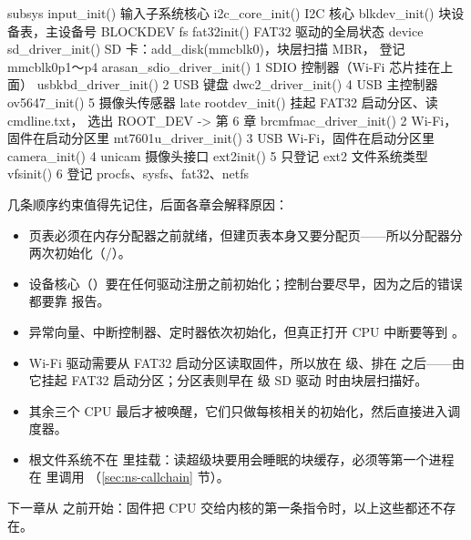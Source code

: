 \begin{txtcode}
subsys   input_init()                 输入子系统核心
         i2c_core_init()              I2C 核心
         blkdev_init()                块设备表，主设备号 BLOCKDEV
fs       fat32init()                  FAT32 驱动的全局状态
device   sd_driver_init()             SD 卡：add_disk(mmcblk0)，块层扫描 MBR，
                                      登记 mmcblk0p1～p4
         arasan_sdio_driver_init()  1 SDIO 控制器（Wi-Fi 芯片挂在上面）
         usbkbd_driver_init()       2 USB 键盘
         dwc2_driver_init()         4 USB 主控制器
         ov5647_init()              5 摄像头传感器
late     rootdev_init()               挂起 FAT32 启动分区、读 cmdline.txt，
                                      选出 ROOT_DEV                -> 第 6 章
         brcmfmac_driver_init()     2 Wi-Fi，固件在启动分区里
         mt7601u_driver_init()      3 USB Wi-Fi，固件在启动分区里
         camera_init()              4 unicam 摄像头接口
         ext2init()                 5 只登记 ext2 文件系统类型
         vfsinit()                  6 登记 procfs、sysfs、fat32、netfs
\end{txtcode}

几条顺序约束值得先记住，后面各章会解释原因：

\begin{itemize}
  \item 页表必须在内存分配器之前就绪，但建页表本身又要分配页——所以分配器分两次初始化（/）。
  \item 设备核心（）要在任何驱动注册之前初始化；控制台要尽早，因为之后的错误都要靠  报告。
  \item 异常向量、中断控制器、定时器依次初始化，但真正打开 CPU 中断要等到 。
  \item Wi-Fi 驱动需要从 FAT32 启动分区读取固件，所以放在  级、排在  之后——由它挂起 FAT32 启动分区；分区表则早在  级 SD 驱动  时由块层扫描好。
  \item 其余三个 CPU 最后才被唤醒，它们只做每核相关的初始化，然后直接进入调度器。
  \item 根文件系统不在  里挂载：读超级块要用会睡眠的块缓存，必须等第一个进程在  里调用 （\ref{sec:ns-callchain} 节）。
\end{itemize}

下一章从  之前开始：固件把 CPU 交给内核的第一条指令时，以上这些都还不存在。
